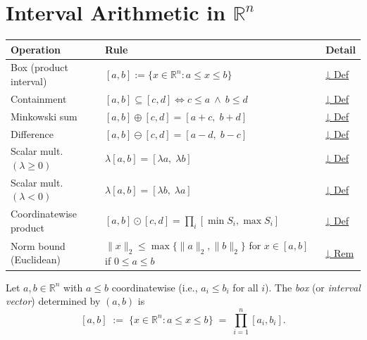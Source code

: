 
\section{Interval Arithmetic in $\mathbb{R}^n$}
\label{sec:interval-arithmetic-rn}

\begin{tcolorbox}[colback=gray!6, colframe=gray!40, arc=2pt,
  left=6pt, right=6pt, top=4pt, bottom=4pt,
  title={\small\textbf{Box (Interval) Arithmetic in $\mathbb{R}^n$ — Quick Reference}},
  fonttitle=\small\bfseries]
\small
\begin{tabular}{l l l}
\toprule
\textbf{Operation} & \textbf{Rule} & \textbf{Detail} \\
\midrule
Box (product interval) & $[a,b] := \{x\in\mathbb{R}^n : a\le x \le b\}$ & \hyperref[def:box]{↓ Def} \\
Containment & $[a,b]\subseteq[c,d] \iff c\le a \ \land\ b\le d$ & \hyperref[def:box-contain]{↓ Def} \\
Minkowski sum & $[a,b]\oplus[c,d]=[a+c,\; b+d]$ & \hyperref[def:box-add]{↓ Def} \\
Difference & $[a,b]\ominus[c,d]=[a-d,\; b-c]$ & \hyperref[def:box-sub]{↓ Def} \\
Scalar mult. $(\lambda\ge 0)$ & $\lambda[a,b]=[\lambda a,\; \lambda b]$ & \hyperref[def:box-smul]{↓ Def} \\
Scalar mult. $(\lambda<0)$ & $\lambda[a,b]=[\lambda b,\; \lambda a]$ & \hyperref[def:box-smul]{↓ Def} \\
Coordinatewise product & $[a,b]\odot[c,d]=\prod_i [\min S_i,\max S_i]$ & \hyperref[def:box-hadamard]{↓ Def} \\
Norm bound (Euclidean) & $\|x\|_2 \le \max\{\|a\|_2,\|b\|_2\}$ for $x\in[a,b]$ if $0\le a\le b$ & \hyperref[rem:norm-bounds]{↓ Rem} \\
\bottomrule
\end{tabular}
\end{tcolorbox}

\vspace{1em}


\begin{tcolorbox}[colback=propbox, colframe=propborder, arc=2pt,
  left=6pt, right=6pt, top=4pt, bottom=4pt,
  title={\small\textbf{Definition (Box / Product Interval)}},
  fonttitle=\small\bfseries]
\label{def:box}
Let $a,b\in\mathbb{R}^n$ with $a\le b$ coordinatewise (i.e., $a_i\le b_i$ for all $i$).
The \emph{box} (or \emph{interval vector}) determined by $(a,b)$ is
\[
[a,b] \;:=\; \{x\in\mathbb{R}^n : a\le x \le b\}
\;=\;\prod_{i=1}^n [a_i,b_i].
\]
\end{tcolorbox}

